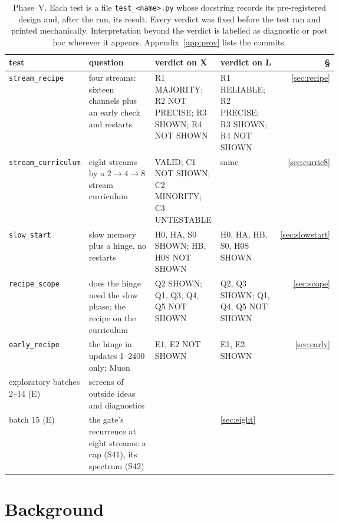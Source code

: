 \documentclass[11pt]{article}
\begin{document}
\begin{table}[h]
\centering
\footnotesize
\setlength{\tabcolsep}{4pt}
\begin{tabular}{@{}l>{\raggedright\arraybackslash}p{0.25\linewidth}>{\raggedright\arraybackslash}p{0.2\linewidth}>{\raggedright\arraybackslash}p{0.2\linewidth}r@{}}
\toprule
test & question & verdict on X & verdict on L & \S\\
\midrule
\texttt{stream\_recipe} & four streams: sixteen channels plus an early check and restarts & R1 MAJORITY; R2 NOT PRECISE; R3 SHOWN; R4 NOT SHOWN & R1 RELIABLE; R2 PRECISE; R3 SHOWN; R4 NOT SHOWN & \ref{sec:recipe}\\
\texttt{stream\_curriculum} & eight streams by a $2 \to 4 \to 8$ stream curriculum & VALID; C1 NOT SHOWN; C2 MINORITY; C3 UNTESTABLE & same & \ref{sec:curric8}\\
\texttt{slow\_start} & slow memory plus a hinge, no restarts & H0, HA, S0 SHOWN; HB, H0S NOT SHOWN & H0, HA, HB, S0, H0S SHOWN & \ref{sec:slowstart}\\
\texttt{recipe\_scope} & does the hinge need the slow phase; the recipe on the curriculum & Q2 SHOWN; Q1, Q3, Q4, Q5 NOT SHOWN & Q2, Q3 SHOWN; Q1, Q4, Q5 NOT SHOWN & \ref{sec:scope}\\
\texttt{early\_recipe} & the hinge in updates 1--2400 only; Muon & E1, E2 NOT SHOWN & E1, E2 SHOWN & \ref{sec:early}\\
\midrule
exploratory batches 2--14 (E) & 34 screens of outside ideas and diagnostics & \multicolumn{2}{l}{see Sections~\ref{sec:screens}, \ref{sec:kick}--\ref{sec:far}} & \\
batch 15 (E) & the gate's recurrence at eight streams: a cap (S41), its spectrum (S42) & \multicolumn{2}{l}{S41 running; S42 finished} & \ref{sec:eight}\\
\bottomrule
\end{tabular}
\caption{Phase~V. Each test is a file \texttt{test\_<name>.py} whose docstring records its pre-registered design and, after the run, its result. Every verdict was fixed before the test ran and printed mechanically. Interpretation beyond the verdict is labelled as diagnostic or post hoc wherever it appears. Appendix~\ref{app:prov} lists the commits.}
\label{tab:index}
\end{table}

\section{Background}
\label{sec:background}
\end{document}

